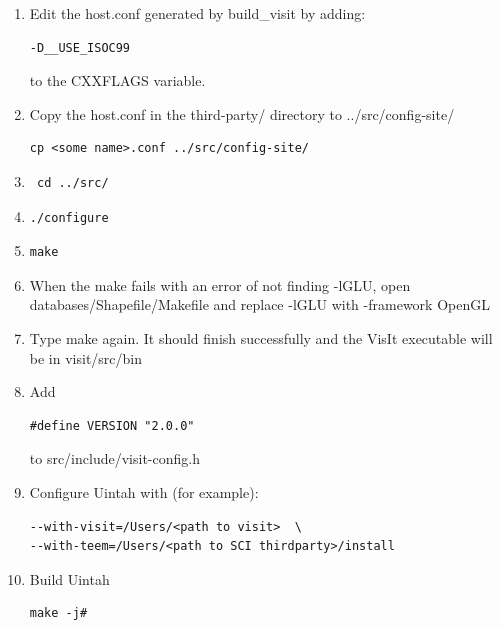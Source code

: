 \documentclass[12pt]{article}
\begin{document}
\begin{enumerate}
\begin{verbatim}
\end{verbatim}
\item Edit the host.conf generated by build\_visit by adding: 
\begin{verbatim}
-D__USE_ISOC99
\end{verbatim} 
 to the CXXFLAGS variable. 
\item Copy the host.conf in the third-party/ directory to ../src/config-site/ 
\begin{verbatim}
cp <some name>.conf ../src/config-site/
\end{verbatim}
\item \begin{verbatim} cd ../src/ \end{verbatim}
\item \begin{verbatim}./configure \end{verbatim} 
\item \begin{verbatim}make \end{verbatim}
\item When the make fails with an error of not finding -lGLU, open databases/Shapefile/Makefile and replace -lGLU with -framework OpenGL
\item Type make again. It should finish successfully and the VisIt executable will be in visit/src/bin
\item Add 
\begin{verbatim}
#define VERSION "2.0.0"
\end{verbatim}  
to src/include/visit-config.h
\item Configure Uintah with (for example): 
\begin{verbatim}
--with-visit=/Users/<path to visit>  \ 
--with-teem=/Users/<path to SCI thirdparty>/install
\end{verbatim}
\item Build Uintah
\begin{verbatim}
make -j# 
\end{verbatim}
\end{enumerate}  
\end{document}
